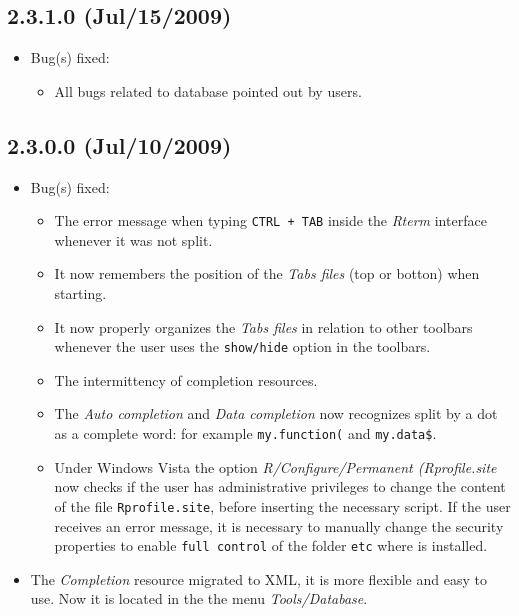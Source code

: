 \subsection*{2.3.1.0 (Jul/15/2009)}
\begin{itemize}
  \item Bug(s) fixed:
    \begin{itemize}
      \item All bugs related to database pointed out by users.
    \end{itemize}
\end{itemize}


\subsection*{2.3.0.0 (Jul/10/2009)}
\begin{itemize}
  \item Bug(s) fixed:
    \begin{itemize}
      \item The error message when typing \texttt{CTRL + TAB} inside
        the \textit{Rterm} interface whenever it was not split.
      \item It now remembers the position of the \textit{Tabs files}
        (top or botton) when starting.
      \item It now properly organizes the \textit{Tabs files} in
        relation to other toolbars whenever the user uses the
        \texttt{show/hide} option in the toolbars.
      \item The intermittency of completion resources.
      \item The \textit{Auto completion} and \textit{Data completion}
        now recognizes split by a dot as a complete word: for example
        \texttt{my.function(} and \texttt{my.data\$}.
      \item Under Windows Vista the option \textit{R/Configure/Permanent
          (Rprofile.site} now checks if the user has administrative
        privileges to change the content of the file \texttt{Rprofile.site},
        before inserting the necessary script. If the user receives an error
        message, it is necessary to manually change the security
        properties to enable \texttt{full control} of the folder
        \texttt{etc} where \RR{} is installed.
    \end{itemize}
  \item The \textit{Completion} resource migrated to XML, it is more flexible
    and easy to use. Now it is located in the the menu \textit{Tools/Database}.

\end{itemize}
